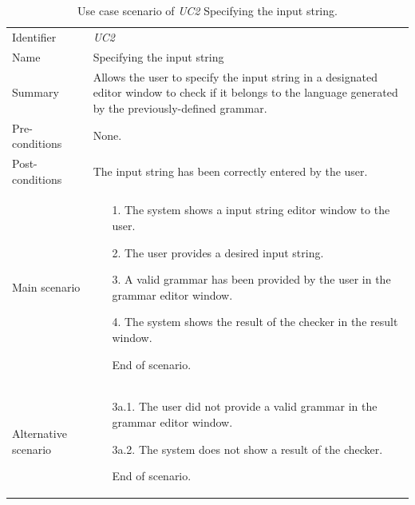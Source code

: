 \documentclass[english,bachelors,forcepolishlogotype]{wizthesis}
\begin{document}
\begin{xltabular}{\textwidth}{@{}L{3cm}X@{}}
  \caption{Use case scenario of \emph{UC2} Specifying the input string.}
  \label{tab:uc2-scenario}\\
  \toprule
  \endfirsthead
  \endhead
  \endfoot
  \endlastfoot
  Identifier & \emph{UC2} \\
  \addlinespace[0.5em] Name & Specifying the input string \\
  \addlinespace[0.5em] Summary & Allows the user to specify the input string in
  a designated editor window to check if it belongs to the language generated by
  the previously-defined grammar. \\
  \addlinespace[0.5em] Pre-conditions & None. \\
  \addlinespace[0.5em] Post-conditions & The input string has been correctly
  entered by the user. \\
  \addlinespace[0.5em] Main scenario &
  \begin{enumerate}[noitemsep,nolistsep,labelindent=0.5cm,align=right]
    \item [1.] The system shows a input string editor window to the user.
    \item [2.] The user provides a desired input string.
    \item [3.] A valid grammar has been provided by the user in the grammar
    editor window.
    \item [4.] The system shows the result of the checker in the result window.
    \item [] End of scenario.
  \end{enumerate} \\
  \addlinespace[0.5em] Alternative scenario &
  \begin{enumerate}[noitemsep,nolistsep,labelindent=0.5cm,align=right]
    \item [3a.1.] The user did not provide a valid grammar in the grammar editor
    window.
    \item [3a.2.] The system does not show a result of the checker.
    \item [] End of scenario.
  \end{enumerate} \\* \bottomrule
\end{xltabular}
\end{document}
